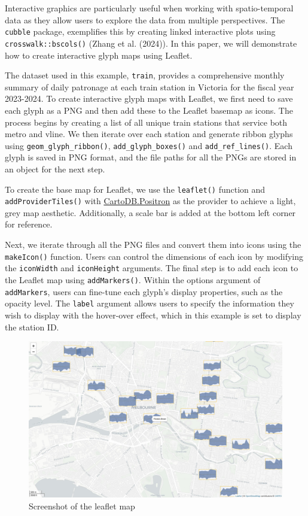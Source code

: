 Interactive graphics are particularly useful when working with spatio-temporal data as they allow users to explore the data from multiple perspectives. The \texttt{cubble} package, exemplifies this by creating linked interactive plots using \texttt{crosswalk::bscols()} (Zhang et al. (2024)). In this paper, we will demonstrate how to create interactive glyph maps using Leaflet.

The dataset used in this example, \texttt{train}, provides a comprehensive monthly summary of daily patronage at each train station in Victoria for the fiscal year 2023-2024. To create interactive glyph maps with Leaflet, we first need to save each glyph as a PNG and then add these to the Leaflet basemap as icons. The process begins by creating a list of all unique train stations that service both metro and vline. We then iterate over each station and generate ribbon glyphs using \texttt{geom\_glyph\_ribbon()}, \texttt{add\_glyph\_boxes()} and \texttt{add\_ref\_lines()}. Each glyph is saved in PNG format, and the file paths for all the PNGs are stored in an object for the next step.

To create the base map for Leaflet, we use the \texttt{leaflet()} function and \texttt{addProviderTiles()} with \href{https://github.com/CartoDB/basemap-styles}{CartoDB.Positron} as the provider to achieve a light, grey map aesthetic. Additionally, a scale bar is added at the bottom left corner for reference.

Next, we iterate through all the PNG files and convert them into icons using the \texttt{makeIcon()} function. Users can control the dimensions of each icon by modifying the \texttt{iconWidth} and \texttt{iconHeight} arguments. The final step is to add each icon to the Leaflet map using \texttt{addMarkers()}. Within the options argument of \texttt{addMarkers}, users can fine-tune each glyph's display properties, such as the opacity level. The \texttt{label} argument allows users to specify the information they wish to display with the hover-over effect, which in this example is set to display the station ID.

\begin{figure}
\includegraphics[width=41.28in]{figures/leaflet-screenshot} \caption{Screenshot of the leaflet map}\label{fig:unnamed-chunk-25}
\end{figure}

